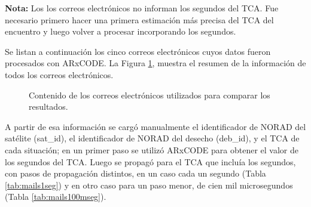 {\bf{Nota:}} Los los correos electr\'onicos no informan los segundos del TCA. Fue necesario primero hacer una primera estimaci\'on m\'as precisa del TCA del encuentro y luego volver a procesar incorporando los segundos. 

Se listan a continuaci\'on los cinco correos electr\'onicos cuyos datos fueron procesados con ARxCODE. La Figura \ref{fig:tablamails}, muestra el resumen de la informaci\'on de todos los correos electr\'onicos. 
\begin{figure}[!h]
  \centering
  \caption{Contenido de los correos electr\'onicos utilizados para comparar los resultados.}
  \label{fig:tablamails}
\end{figure}

A partir de esa informaci\'on se carg\'o manualmente el identificador de NORAD del sat\'elite (sat\_id), el identificador de NORAD del desecho (deb\_id), y el TCA de cada situaci\'on; en un primer paso se utiliz\'o ARxCODE para obtener el valor de los segundos del TCA. Luego se propag\'o para el TCA que inclu\'ia los segundos, con pasos de propagaci\'on distintos, en un caso cada un segundo (Tabla \ref{tab:mails1seg}) y en otro caso para un paso menor, de cien mil microsegundos (Tabla \ref{tab:mails100mseg}).\\

\begin{table}[!h]
\caption{ARxCODE a partir de correos electr\'onicos\\ Propagaciones cada 1 segundo - (Radio de colisi\'on $r_{a}=0.01$ km)}
\label{tab:mails1seg}
\end{table}


